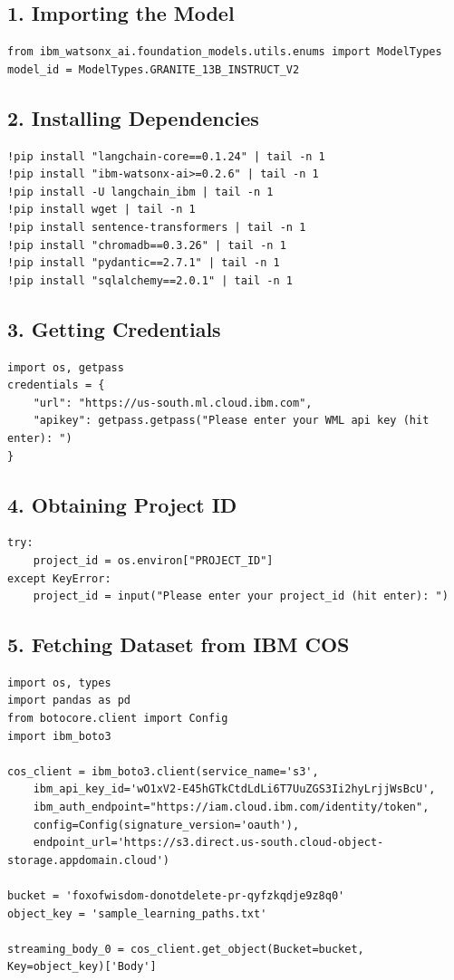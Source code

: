 \documentclass[12pt]{article}
\begin{document}
\subsection*{1. Importing the Model}
\begin{lstlisting}
from ibm_watsonx_ai.foundation_models.utils.enums import ModelTypes
model_id = ModelTypes.GRANITE_13B_INSTRUCT_V2
\end{lstlisting}

\subsection*{2. Installing Dependencies}
\begin{lstlisting}
!pip install "langchain-core==0.1.24" | tail -n 1 
!pip install "ibm-watsonx-ai>=0.2.6" | tail -n 1
!pip install -U langchain_ibm | tail -n 1
!pip install wget | tail -n 1
!pip install sentence-transformers | tail -n 1
!pip install "chromadb==0.3.26" | tail -n 1
!pip install "pydantic==2.7.1" | tail -n 1
!pip install "sqlalchemy==2.0.1" | tail -n 1
\end{lstlisting}

\subsection*{3. Getting Credentials}
\begin{lstlisting}
import os, getpass
credentials = {
    "url": "https://us-south.ml.cloud.ibm.com",
    "apikey": getpass.getpass("Please enter your WML api key (hit enter): ")
}
\end{lstlisting}

\subsection*{4. Obtaining Project ID}
\begin{lstlisting}
try:
    project_id = os.environ["PROJECT_ID"]
except KeyError:
    project_id = input("Please enter your project_id (hit enter): ")
\end{lstlisting}

\subsection*{5. Fetching Dataset from IBM COS}
\begin{lstlisting}
import os, types
import pandas as pd
from botocore.client import Config
import ibm_boto3

cos_client = ibm_boto3.client(service_name='s3',
    ibm_api_key_id='wO1xV2-E45hGTkCtdLdLi6T7UuZGS3Ii2hyLrjjWsBcU',
    ibm_auth_endpoint="https://iam.cloud.ibm.com/identity/token",
    config=Config(signature_version='oauth'),
    endpoint_url='https://s3.direct.us-south.cloud-object-storage.appdomain.cloud')

bucket = 'foxofwisdom-donotdelete-pr-qyfzkqdje9z8q0'
object_key = 'sample_learning_paths.txt'

streaming_body_0 = cos_client.get_object(Bucket=bucket, Key=object_key)['Body']
\end{lstlisting}
\end{document}
